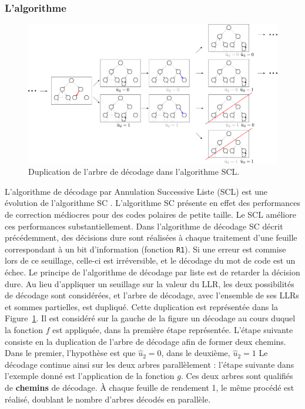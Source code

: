 \subsubsection{L'algorithme}
\begin{figure}[t]
\centering
\includegraphics[width=1\textwidth]{main/ch1_fig/scl}
\caption{Duplication de l'arbre de décodage dans l'algorithme SCL.}
\label{fig:scl}
\end{figure}
L'algorithme de décodage par Annulation Successive Liste (SCL) est une évolution de l'algorithme SC \cite{tal_how_2013}. L'algorithme SC présente en effet des performances de correction médiocres pour des codes polaires de petite taille. Le SCL améliore ces performances substantiellement. Dans l'algorithme de décodage SC décrit précédemment, des décisions dure sont réalisées à chaque traitement d'une feuille correspondant à un bit d'information (fonction \texttt{R1}). Si une erreur est commise lors de ce seuillage, celle-ci est irréversible, et le décodage du mot de code est un échec. Le principe de l'algorithme de décodage par liste est de retarder la décision dure. Au lieu d'appliquer un seuillage sur la valeur du LLR, les deux possibilités de décodage sont considérées, et l'arbre de décodage, avec l'ensemble de ses LLRs et sommes partielles, est dupliqué. Cette duplication est représentée dans la Figure~\ref{fig:scl}. Il est considéré sur la gauche de la figure un décodage au cours duquel la fonction $f$ est appliquée, dans la première étape représentée. L'étape suivante consiste en la duplication de l'arbre de décodage afin de former deux chemins. Dans le premier, l'hypothèse est que $\hat{u}_2=0$, dans le deuxième, $\hat{u}_2=1$ Le décodage continue ainsi sur les deux arbres parallèlement : l'étape suivante dans l'exemple donné est l'application de la fonction $g$. Ces deux arbres sont qualifiés de \textbf{chemins} de décodage. \`A chaque feuille de rendement 1, le même procédé est réalisé, doublant le nombre d'arbres décodés en parallèle.


